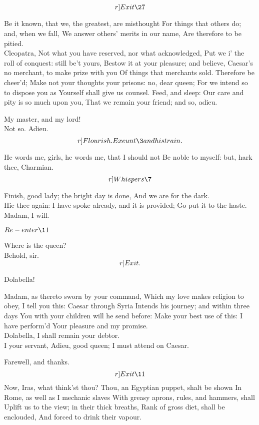 \documentclass{book}
\begin{document}
	\[r]Exit \27\]

\2	Be it known, that we, the greatest, are misthought
	For things that others do; and, when we fall,
	We answer others' merits in our name,
	Are therefore to be pitied. \\

\3	Cleopatra,
	Not what you have reserved, nor what acknowledged,
	Put we i' the roll of conquest: still be't yours,
	Bestow it at your pleasure; and believe,
	Caesar's no merchant, to make prize with you
	Of things that merchants sold. Therefore be cheer'd;
	Make not your thoughts your prisons: no, dear queen;
	For we intend so to dispose you as
	Yourself shall give us counsel. Feed, and sleep:
	Our care and pity is so much upon you,
	That we remain your friend; and so, adieu.

\2	My master, and my lord! \\

\3	Not so. Adieu. 	\[r]Flourish. Exeunt \3 and his train.\]

\2	He words me, girls, he words me, that I should not
	Be noble to myself: but, hark thee, Charmian.
	\[r]Whispers \7\]

	Finish, good lady; the bright day is done,
	And we are for the dark. \\

\2	Hie thee again:
	I have spoke already, and it is provided;
	Go put it to the haste. \\

\7	Madam, I will.

	\(Re-enter \11\)

	Where is the queen? \\

\7	Behold, sir. \\ 	\[r]Exit.\]

\2	Dolabella!

	Madam, as thereto sworn by your command,
	Which my love makes religion to obey,
	I tell you this: Caesar through Syria
	Intends his journey; and within three days
	You with your children will he send before:
	Make your best use of this: I have perform'd
	Your pleasure and my promise. \\

\2	Dolabella,
	I shall remain your debtor. \\

	I your servant,
	Adieu, good queen; I must attend on Caesar.

\2	Farewell, and thanks. \\ \[r]Exit \11\]
		Now, Iras, what think'st thou?
	Thou, an Egyptian puppet, shalt be shown
	In Rome, as well as I	mechanic slaves
	With greasy aprons, rules, and hammers, shall
	Uplift us to the view; in their thick breaths,
	Rank of gross diet, shall be enclouded,
	And forced to drink their vapour. \\
\end{document}
